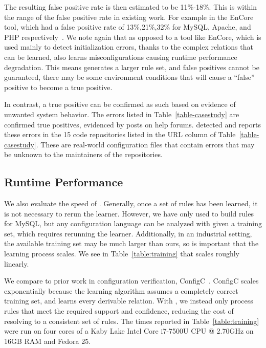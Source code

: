 The resulting false positive rate is then estimated to be 11\%-18\%.
This is within the range of the false positive rate in existing work.
For example in the EnCore tool, which had a false positive rate of 13\%,21\%,32\% for MySQL, Apache, and PHP respectively~\cite{zhang14encore}.
We note again that as opposed to a tool like EnCore, which is used mainly to detect initialization errors, thanks to the complex relations that can be learned, \app also learns misconfigurations causing runtime performance degradation.
This means \app generates a larger rule set, and false positives cannot be guaranteed, \ie there may be some environment conditions that will cause a ``false'' positive to become a true positive.

In contrast, a true positive can be confirmed as such based on evidence of unwanted system behavior.
The errors listed in Table~\ref{table-casestudy} are confirmed true positives, evidenced by posts on help forums.
\app detected and reports these errors in the 15 code repositories listed in the URL column of Table~\ref{table-casestudy}. 
These are real-world configuration files that contain errors that may be unknown to the maintainers of the repositories.

\subsection{Runtime Performance}
We also evaluate the speed of \app.
Generally, once a set of rules has been learned, it is not necessary to rerun the learner.
However, we have only used \app to build rules for MySQL, but any configuration language can be analyzed with \app given a training set, which requires rerunning the learner.
Additionally, in an industrial setting, the available training set may be much larger than ours, so is important that the learning process scales.
We see in Table~\ref{table:training} that \app scales roughly linearly.

We compare \app to prior work in configuration verification, ConfigC~\cite{santolucitoCAV}.
ConfigC scales exponentially because the learning algorithm assumes a completely correct training set, and learns every derivable relation.
With \app, we instead only process rules that meet the required support and confidence, reducing the cost of resolving to a consistent set of rules. 
The times reported in Table~\ref{table:training} were run on four cores of a Kaby Lake Intel Core i7-7500U CPU @ 2.70GHz on 16GB RAM and Fedora 25.

